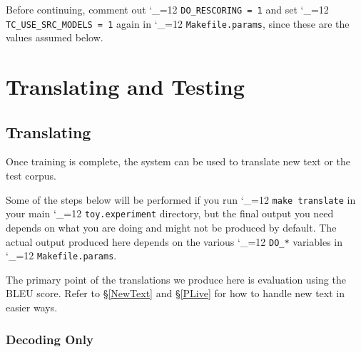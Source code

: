 \documentclass[11pt,letterpaper]{article}
\def\code{\begingroup\catcode`\_=12 \codex}
\newcommand{\codex}[1]{\texttt{#1}\endgroup}
\begin{document}
Before continuing, comment out \code{DO_RESCORING = 1} and set
\code{TC_USE_SRC_MODELS = 1} again in \code{Makefile.params}, since these are
the values assumed below.

\section{Translating and Testing} \label{TranslatingTesting}

\subsection{Translating} \label{Translating}

Once training is complete, the system can be used to translate new text or the
test corpus.

Some of the steps below will be performed if you run \code{make translate} in
your main \code{toy.experiment} directory, but the final output you need
depends on what you are doing and might not be produced by default. The actual
output produced here depends on the various \code{DO_*} variables in
\code{Makefile.params}.

The primary point of the translations we produce here is evaluation using the
BLEU score.  Refer to \S\ref{NewText} and \S\ref{PLive} for how to handle new
text in easier ways.

\subsubsection{Decoding Only} \label{Decoding}
\end{document}
